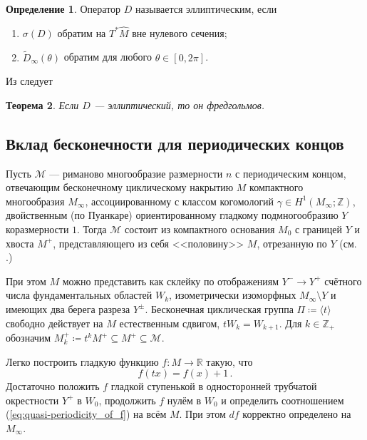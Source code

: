 \documentclass[a4paper, 12pt]{article}
\newtheorem{theorem}{Теорема}[section]
\theoremstyle{definition}
\newtheorem{definition}[theorem]{Определение}
\begin{document}
\begin{definition}
    Оператор \({ D }\) называется эллиптическим, если 
    \begin{enumerate}
        \item \({ \sigma(D) }\) обратим на \({ T^{*}\hat{M} }\) вне нулевого сечения;
        \item \({ \widetilde D_{\infty}(\theta) }\) обратим для любого \({ \theta \in [0, 2\pi] }\).
    \end{enumerate}
\end{definition}

Из \cite[Теорема 2]{рабинович1982алгебре} следует

\begin{theorem}
    Если \({ D }\) --- эллиптический, то он фредгольмов.
\end{theorem}

\subsection{Вклад бесконечности для периодических концов}
\label{sub:periodic_ends_contribution}

Пусть \({ \mathcal M }\) --- риманово многообразие размерности \({ n }\) с периодическим концом, отвечающим бесконечному циклическому накрытию \({ M }\) компактного многообразия \({ M_{\infty} }\), ассоциированному с классом когомологий \({ \gamma \in H^{1}(M_{\infty}; \mathbb Z) }\), двойственным (по Пуанкаре) ориентированному гладкому подмногообразию \({ Y }\) коразмерности \({ 1 }\). Тогда \({ \mathcal M }\) состоит из компактного основания \({ M_{0} }\) с границей \({ Y }\) и хвоста \({ M^{+} }\), представляющего из себя <<половину>> \({ M }\), отрезанную по \({ Y }\) (см. \cite{mrowka2015index}.) 

При этом \({ M }\) можно представить как склейку по отображениям \({ Y^{-} \to Y^{+} }\) счётного числа фундаментальных областей \({ W_{k} }\), изометрически изоморфных \({ M_{\infty} \setminus Y }\) и имеющих два берега разреза \({ Y^{\pm} }\).
Бесконечная циклическая группа \({ \Pi \coloneqq \langle t \rangle }\) свободно действует на \({ M }\) естественным сдвигом, \({ t W_{k} = W_{k+1} }\). Для \({ k \in \mathbb Z_{+} }\) обозначим \({ M^{+}_{k} \coloneqq t^{k} M^{+} \subseteq M^{+} \subseteq \mathcal M }\).

Легко построить гладкую функцию \({ f : M \to \mathbb R }\) такую, что \begin{equation}
    \label{eq:quasi-periodicity_of_f}
    f(tx) = f(x) + 1\,.
\end{equation} Достаточно положить \({ f }\) гладкой ступенькой в односторонней трубчатой окрестности \({ Y^{+} }\) в \({ W_{0} }\), продолжить \({ f }\) нулём в \({ W_{0} }\) и определить соотношением (\ref{eq:quasi-periodicity_of_f}) на всём \({ M }\). При этом \({ df }\) корректно определено на \({ M_{\infty} }\).
\end{document}
